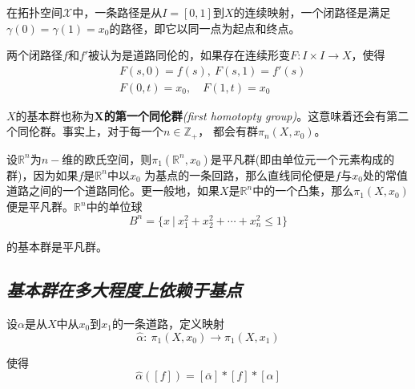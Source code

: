 在拓扑空间$\mathcal{X}$中，一条路径是从$I=[0,1]$到$X$的连续映射，一个闭路径是满足$\gamma(0)=\gamma(1)=x_0$的路径，即它以同一点为起点和终点。

两个闭路径$f$和$f'$被认为是道路同伦的，如果存在连续形变$F:I\times I\rightarrow X$，使得
\begin{equation}
    \begin{aligned}
        & F(s,0)=f(s),\ F(s,1)=f'(s)\\
        & F(0,t)=x_0,\hspace{1em}  F(1,t)=x_0
    \end{aligned}
\end{equation}

$X$的基本群也称为\textbf{X的第一个同伦群}\textsl{(first homotopty group)}。这意味着还会有第二个同伦群。事实上，对于每一个$n\in \mathbb{Z}_+$，
都会有群$\pi_n(X,x_0)$。

\begin{example}
    设$\mathbb{R}^n$为$n-$维的欧氏空间，则$\pi_1(\mathbb{R}^n,x_0)$是平凡群(即由单位元一个元素构成的群)，因为如果$f$是$\mathbb{R}^n$中以$x_0$
    为基点的一条回路，那么直线同伦便是$f$与$x_0$处的常值道路之间的一个道路同伦。更一般地，如果$X$是$\mathbb{R}^n$中的一个凸集，那么$\pi_1(X,x_0)$便是平凡群。$\mathbb{R}^n$中的单位球
    \begin{equation}
        B^n=\{x\ |\ x^2_1+x^2_2+\cdots+x^2_n\leqslant 1\}
    \end{equation}

    的基本群是平凡群。
\end{example}

\subsection*{\textsl{基本群在多大程度上依赖于基点}}

\vspace*{1em}

\begin{define}
    设$\alpha$是从$X$中从$x_0$到$x_1$的一条道路，定义映射
    \begin{equation}
        \hat{\alpha}:\ \pi_1(X,x_0)\rightarrow \pi_1(X,x_1)
    \end{equation}

    使得
    \begin{equation}
        \hat{\alpha}([f])=[\overline{\alpha}]*[f]*[\alpha]
    \end{equation}

\end{define}

